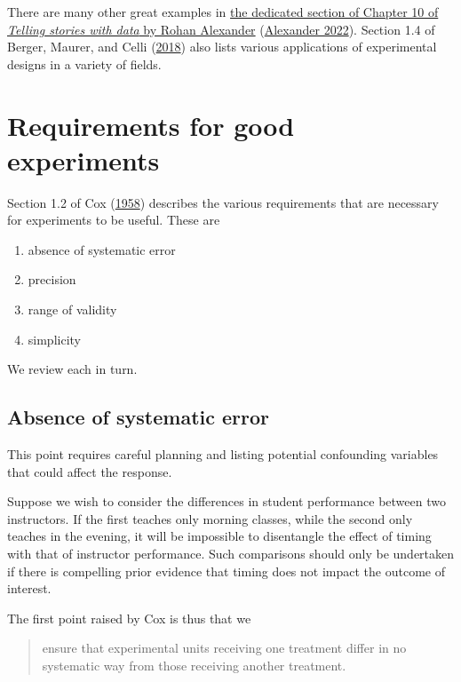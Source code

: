 \documentclass[
  11pt,
  letterpaper,
]{scrbook}
\providecommand{\tightlist}{%
  \setlength{\itemsep}{0pt}\setlength{\parskip}{0pt}}\usepackage{longtable,booktabs,array}
\theoremstyle{definition}
\theoremstyle{remark}
\begin{document}
There are many other great examples in
\href{https://tellingstorieswithdata.com/08-hunt.html\#rct-examples}{the
dedicated section of Chapter 10 of \emph{Telling stories with data} by
Rohan Alexander} (\protect\hyperlink{ref-Alexander2021}{Alexander
2022}). Section 1.4 of Berger, Maurer, and Celli
(\protect\hyperlink{ref-Berger:2018}{2018}) also lists various
applications of experimental designs in a variety of fields.

\hypertarget{requirements-for-good-experiments}{%
\section{Requirements for good
experiments}\label{requirements-for-good-experiments}}

Section 1.2 of Cox (\protect\hyperlink{ref-Cox:1958}{1958}) describes
the various requirements that are necessary for experiments to be
useful. These are

\begin{enumerate}
\def\labelenumi{\arabic{enumi}.}
\tightlist
\item
  absence of systematic error
\item
  precision
\item
  range of validity
\item
  simplicity
\end{enumerate}

We review each in turn.

\hypertarget{absence-of-systematic-error}{%
\subsection{Absence of systematic
error}\label{absence-of-systematic-error}}

This point requires careful planning and listing potential confounding
variables that could affect the response.

Suppose we wish to consider the differences in student performance
between two instructors. If the first teaches only morning classes,
while the second only teaches in the evening, it will be impossible to
disentangle the effect of timing with that of instructor performance.
Such comparisons should only be undertaken if there is compelling prior
evidence that timing does not impact the outcome of interest.

The first point raised by Cox is thus that we

\begin{quote}
ensure that experimental units receiving one treatment differ in no
systematic way from those receiving another treatment.
\end{quote}
\end{document}
